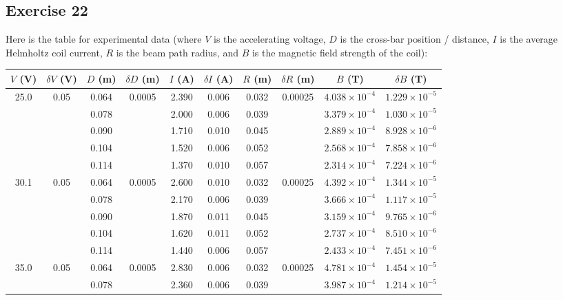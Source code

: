 \documentclass{article}
\begin{document}
\subsection{Exercise 22}
Here is the table for experimental data (where $V$ is the accelerating voltage, $D$ is the cross-bar position / distance, $I$ is the average Helmholtz coil current, $R$ is the beam path radius, and $B$ is the magnetic field strength of the coil):
\begin{table}[ht]
\centering
\small
\begin{tabular}{cccccccccc}
\toprule
$V$ (V) & $\delta V$ (V) & $D$ (m) & $\delta D$ (m) & $I$ (A) & $\delta I$ (A) & $R$ (m) & $\delta R$ (m) & $B$ (T) & $\delta B$ (T) \\
\midrule
25.0 & 0.05 & 0.064 & 0.0005 & 2.390 & 0.006 & 0.032 & 0.00025 & $4.038\times10^{-4}$ & $1.229\times10^{-5}$ \\
     &      & 0.078 &        & 2.000 & 0.006 & 0.039 &          & $3.379\times10^{-4}$ & $1.030\times10^{-5}$ \\
     &      & 0.090 &        & 1.710 & 0.010 & 0.045 &          & $2.889\times10^{-4}$ & $8.928\times10^{-6}$ \\
     &      & 0.104 &        & 1.520 & 0.006 & 0.052 &          & $2.568\times10^{-4}$ & $7.858\times10^{-6}$ \\
     &      & 0.114 &        & 1.370 & 0.010 & 0.057 &          & $2.314\times10^{-4}$ & $7.224\times10^{-6}$ \\
\midrule
30.1 & 0.05 & 0.064 & 0.0005 & 2.600 & 0.010 & 0.032 & 0.00025 & $4.392\times10^{-4}$ & $1.344\times10^{-5}$ \\
     &      & 0.078 &        & 2.170 & 0.006 & 0.039 &          & $3.666\times10^{-4}$ & $1.117\times10^{-5}$ \\
     &      & 0.090 &        & 1.870 & 0.011 & 0.045 &          & $3.159\times10^{-4}$ & $9.765\times10^{-6}$ \\
     &      & 0.104 &        & 1.620 & 0.011 & 0.052 &          & $2.737\times10^{-4}$ & $8.510\times10^{-6}$ \\
     &      & 0.114 &        & 1.440 & 0.006 & 0.057 &          & $2.433\times10^{-4}$ & $7.451\times10^{-6}$ \\
\midrule
35.0 & 0.05 & 0.064 & 0.0005 & 2.830 & 0.006 & 0.032 & 0.00025 & $4.781\times10^{-4}$ & $1.454\times10^{-5}$ \\
     &      & 0.078 &        & 2.360 & 0.006 & 0.039 &          & $3.987\times10^{-4}$ & $1.214\times10^{-5}$ \\

\end{tabular}
\end{table}
\end{document}
